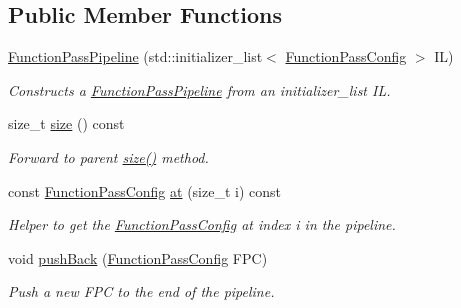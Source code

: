 \subsection*{Public Member Functions}
\begin{DoxyCompactItemize}
\item 
\mbox{\label{classglow_1_1_function_pass_pipeline_a72bd932bd113d85439839409f6325ecb}} 
\hyperlink{classglow_1_1_function_pass_pipeline_a72bd932bd113d85439839409f6325ecb}{Function\+Pass\+Pipeline} (std\+::initializer\+\_\+list$<$ \hyperlink{classglow_1_1_function_pass_config}{Function\+Pass\+Config} $>$ IL)
\begin{DoxyCompactList}\small\item\em Constructs a \hyperlink{classglow_1_1_function_pass_pipeline}{Function\+Pass\+Pipeline} from an initializer\+\_\+list {\ttfamily IL}. \end{DoxyCompactList}\item 
size\+\_\+t \hyperlink{classglow_1_1_function_pass_pipeline_acf021b258120117a9235f8b3226d97bf}{size} () const
\begin{DoxyCompactList}\small\item\em Forward to parent \hyperlink{classglow_1_1_function_pass_pipeline_acf021b258120117a9235f8b3226d97bf}{size()} method. \end{DoxyCompactList}\item 
\mbox{\label{classglow_1_1_function_pass_pipeline_a31a0a5185a516472c9b362bb61938460}} 
const \hyperlink{classglow_1_1_function_pass_config}{Function\+Pass\+Config} \hyperlink{classglow_1_1_function_pass_pipeline_a31a0a5185a516472c9b362bb61938460}{at} (size\+\_\+t i) const
\begin{DoxyCompactList}\small\item\em Helper to get the \hyperlink{classglow_1_1_function_pass_config}{Function\+Pass\+Config} at index {\ttfamily i} in the pipeline. \end{DoxyCompactList}\item 
\mbox{\label{classglow_1_1_function_pass_pipeline_a077f862f56d745dac40a6cd9b588a633}} 
void \hyperlink{classglow_1_1_function_pass_pipeline_a077f862f56d745dac40a6cd9b588a633}{push\+Back} (\hyperlink{classglow_1_1_function_pass_config}{Function\+Pass\+Config} F\+PC)
\begin{DoxyCompactList}\small\item\em Push a new {\ttfamily F\+PC} to the end of the pipeline. \end{DoxyCompactList}\item 

\end{DoxyCompactItemize}

